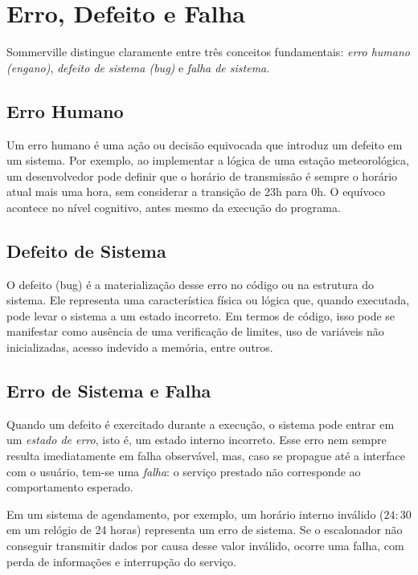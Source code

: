 \documentclass[12pt,a4paper]{report}
\begin{document}
\section{Erro, Defeito e Falha}

Sommerville distingue claramente entre três conceitos fundamentais:
\emph{erro humano (engano)}, \emph{defeito de sistema (bug)} e
\emph{falha de sistema}.

\subsection{Erro Humano}

Um erro humano é uma ação ou decisão equivocada que introduz um defeito em
um sistema. Por exemplo, ao implementar a lógica de uma estação
meteorológica, um desenvolvedor pode definir que o horário de transmissão é
sempre o horário atual mais uma hora, sem considerar a transição de 23h para
0h. O equívoco acontece no nível cognitivo, antes mesmo da execução do
programa.

\subsection{Defeito de Sistema}

O defeito (bug) é a materialização desse erro no código ou na estrutura do
sistema. Ele representa uma característica física ou lógica que, quando
executada, pode levar o sistema a um estado incorreto. Em termos de código,
isso pode se manifestar como ausência de uma verificação de limites, uso de
variáveis não inicializadas, acesso indevido a memória, entre outros.

\subsection{Erro de Sistema e Falha}

Quando um defeito é exercitado durante a execução, o sistema pode entrar em
um \emph{estado de erro}, isto é, um estado interno incorreto. Esse erro
nem sempre resulta imediatamente em falha observável, mas, caso se propague
até a interface com o usuário, tem-se uma \emph{falha}: o serviço prestado
não corresponde ao comportamento esperado.

Em um sistema de agendamento, por exemplo, um horário interno inválido
(\(24{:}30\) em um relógio de 24 horas) representa um erro de sistema. Se o
escalonador não conseguir transmitir dados por causa desse valor inválido,
ocorre uma falha, com perda de informações e interrupção do serviço.
\end{document}
